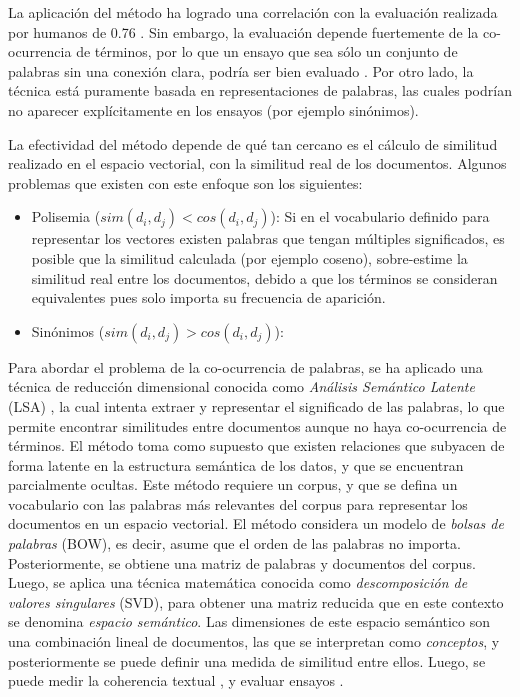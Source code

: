 \documentclass[12pt]{diicc}
\begin{document}
La aplicación del método ha logrado una correlación con la evaluación realizada por humanos de 0.76 \cite{t5}. Sin embargo, la evaluación depende fuertemente de la co-ocurrencia de términos, por lo que un ensayo que sea sólo un conjunto de palabras sin una conexión clara, podría ser bien evaluado \cite{t9}. Por otro lado, la técnica está puramente basada en representaciones de palabras, las cuales podrían no aparecer explícitamente en los ensayos (por ejemplo sinónimos).

La efectividad del método depende de qué tan cercano es el cálculo de similitud realizado en el espacio vectorial, con la similitud real de los documentos. Algunos problemas que existen con este enfoque son los siguientes:

\begin{itemize}
	\item Polisemia ($sim(d_i, d_j) < cos(d_i, d_j)$): Si en el vocabulario definido para representar los vectores existen palabras que tengan múltiples significados, es posible que la similitud calculada (por ejemplo coseno), sobre-estime la similitud real entre los documentos, debido a que los términos se consideran equivalentes pues solo importa su frecuencia de aparición.
	\item Sinónimos ($sim(d_i, d_j) > cos(d_i, d_j)$): 
\end{itemize}

Para abordar el problema de la co-ocurrencia de palabras, se ha aplicado una técnica de reducción dimensional conocida como {\em Análisis Semántico Latente} (LSA) \cite{t28}, la cual intenta extraer y representar el significado de las palabras, lo que permite encontrar similitudes entre documentos aunque no haya co-ocurrencia de términos. El método toma como supuesto que existen relaciones que subyacen de forma latente en la estructura semántica de los datos, y que se encuentran parcialmente ocultas. Este método requiere un corpus, y que se defina un vocabulario con las palabras más relevantes del corpus para representar los documentos en un espacio vectorial. El método considera un modelo de {\em bolsas de palabras} (BOW), es decir, asume que el orden de las palabras no importa. Posteriormente, se obtiene una matriz de palabras y documentos del corpus. Luego, se aplica una técnica matemática conocida como {\em descomposición de valores singulares} (SVD), para obtener una matriz reducida que en este contexto se denomina {\em espacio semántico}. Las dimensiones de este espacio semántico son una combinación lineal de documentos, las que se interpretan como {\em conceptos}, y posteriormente se puede definir una medida de similitud entre ellos. Luego, se puede medir la coherencia textual \cite{t8} \cite{t10} \cite{t20} \cite{t29}, y evaluar ensayos \cite{t9}. 
\end{document}
